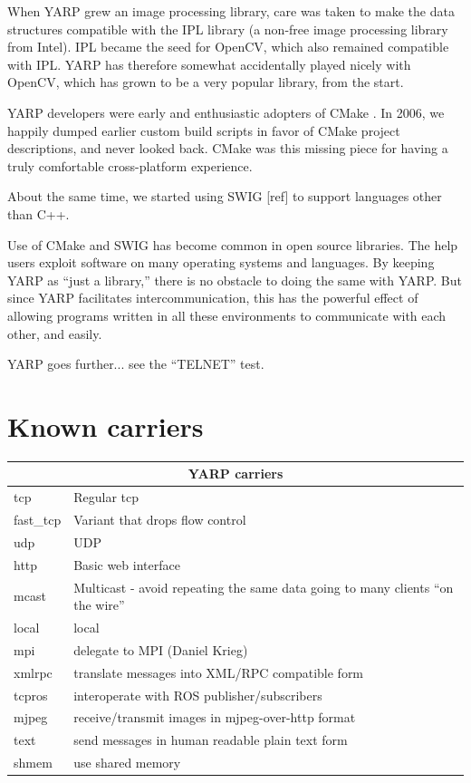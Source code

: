 \documentclass[letterpaper]{article}
\begin{document}
When YARP grew an image processing library, care was taken to make the
data structures compatible with the IPL library (a non-free image
processing library from Intel).  IPL became the seed for OpenCV, which
also remained compatible with IPL. YARP has therefore somewhat
accidentally played nicely with OpenCV, which has grown to be a very
popular library, from the start.

YARP developers were early and enthusiastic adopters of CMake
\cite{fitzpatrick10cmaking}.  In 2006, we happily dumped
earlier custom build scripts in favor of CMake project descriptions,
and never looked back.  CMake was this missing piece for having a
truly comfortable cross-platform experience.

About the same time, we started using SWIG [ref] to support languages
other than C++.

Use of CMake and SWIG has become common in open source libraries.
The help users exploit software on many operating systems and 
languages.  By keeping YARP as ``just a library,'' there is no
obstacle to doing the same with YARP.  But since YARP facilitates
intercommunication, this has the powerful effect of allowing 
programs written in all these environments to communicate with
each other, and easily.

YARP goes further... see the ``TELNET'' test.

\section{Known carriers}

\begin{tabular}{|l|p{7cm}|}
\hline
\multicolumn{2}{|c|}{YARP carriers} \\
\hline
tcp & Regular tcp \\
fast\_tcp & Variant that drops flow control \\
udp & UDP \\
http & Basic web interface \\
mcast & Multicast - avoid repeating the same data going
to many clients ``on the wire''  \\
local & local \\
mpi & delegate to MPI (Daniel Krieg) \\
xmlrpc & translate messages into XML/RPC compatible form \\
tcpros & interoperate with ROS publisher/subscribers \\
mjpeg & receive/transmit images in mjpeg-over-http format \\
text & send messages in human readable plain text form \\
shmem & use shared memory \\
\hline
\end{tabular}
\end{document}
